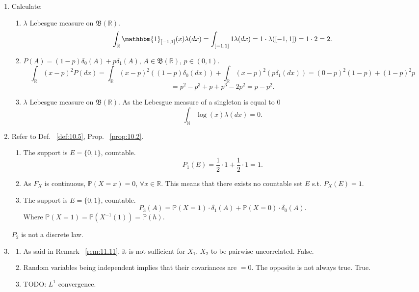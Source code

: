 \begin{exercise}[]
\begin{enumerate}[label=(\alph*)]
        \item Calculate:
            \begin{enumerate}[label=\arabic*.]
                \item $\lambda$ Lebesgue measure on $\mathfrak{B}(\mathbb{R})$.
                    \[
                    \int_{\mathbb{R}} \mathbbm{1}_{[-1,1]}(x) \lambda(dx)
                    = \int_{[-1,1]} 1 \lambda(dx) = 1 \cdot \lambda([-1,1]) = 1 \cdot 2 = 2
                    .\] 
                \item $P(A) = (1-p)\delta_0(A) + p \delta_1(A)$, $A \in \mathfrak{B}(\mathbb{R})$, $p \in (0,1)$.
                    \[
                    \int_{\mathbb{R}} (x-p)^{2}P(dx)
                    = \int_{\mathbb{R}} (x-p)^{2} ((1-p)\delta_0(dx)) + \int_{\mathbb{R}} (x-p)^{2}(p\delta_1(dx))
                    = (0-p)^{2}(1-p) + (1-p)^{2}p
                    \] 
                    \[
                    = p^{2} -p^{3} + p + p^{3} -2p^{2} = p-p^{2}
                    .\] 
                \item $\lambda$ Lebesgue measure on $\mathfrak{B}(\mathbb{R})$. As the Lebesgue measure of a singleton 
                    is equal to $0$
                    \[
                    \int_{\mathbb{N}} \log(x)\lambda(dx) = 0
                    .\] 
            \end{enumerate}
        \item
            Refer to Def. ~\ref{def:10.5}, Prop. ~\ref{prop:10.2}.
            \begin{enumerate}[label=\arabic*.]
                \item The support is $E=\{0,1\} $, countable.
                    \[
                    P_1(E) = \frac{1}{2} \cdot 1 + \frac{1}{2} \cdot 1 = 1
                    .\] 
                \item As $F_X$ is continuous, $\mathbb{P}(X=x)=0$, $\forall x \in \mathbb{R}$. This means that there exists
                    no countable set $E$ s.t. $P_X(E)=1$.
                \item The support is $E=\{0,1\} $, countable.
                    \[
                    P_3(A) = \mathbb{P}(X=1)\cdot \delta_1(A) + \mathbb{P}(X=0)\cdot \delta_0(A)
                    .\] 
                    Where $\mathbb{P}(X=1) = \mathbb{P}(X^{-1}(1)) = \mathbb{P}(h)$.
            \end{enumerate}
            $P_2$ is not a discrete law.
        \item  
          \begin{enumerate}[label=\arabic*.]
            \item As said in Remark ~\ref{rem:11.11}, it is not sufficient
              for $X_1 $, $X_2 $ to be pairwise uncorrelated. False.
            \item Random variables being independent implies that their covariances are $=0 $.
              The opposite is not always true. True.
            \item TODO: $L^{1} $ convergence.
          \end{enumerate}
    \end{enumerate}
\end{exercise}

